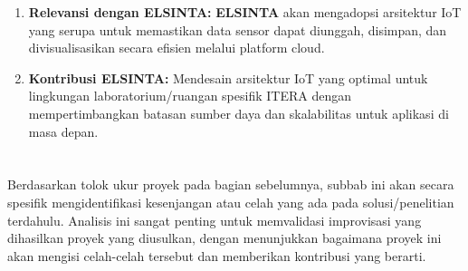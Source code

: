 \documentclass{elsinta}
\begin{document}
\begin{enumerate}
\begin{enumerate}
        \item \textbf{Relevansi dengan  ELSINTA:} \textbf{ ELSINTA} akan mengadopsi arsitektur IoT yang serupa untuk memastikan data sensor dapat diunggah, disimpan, dan divisualisasikan secara efisien melalui platform cloud.
        \item \textbf{Kontribusi  ELSINTA:} Mendesain arsitektur IoT yang optimal untuk lingkungan laboratorium/ruangan spesifik ITERA dengan mempertimbangkan batasan sumber daya dan skalabilitas untuk aplikasi di masa depan.
    \end{enumerate}
\end{enumerate}

\section{\GapAnalysisTitle}
Berdasarkan tolok ukur proyek pada bagian sebelumnya, subbab ini akan secara spesifik mengidentifikasi kesenjangan atau celah yang ada pada solusi/penelitian terdahulu. Analisis ini sangat penting untuk memvalidasi improvisasi yang dihasilkan proyek yang diusulkan, dengan menunjukkan bagaimana proyek ini akan mengisi celah-celah tersebut dan memberikan kontribusi yang berarti.
\end{document}
